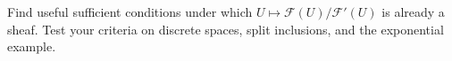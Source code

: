\begin{problem}
Find useful sufficient conditions under which $U\mapsto\mathcal F(U)/\mathcal F'(U)$ is already a sheaf. Test your criteria on discrete spaces, split inclusions, and the exponential example.
\end{problem}
